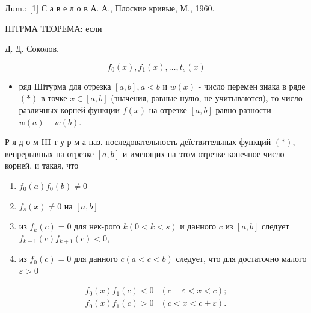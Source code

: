\documentclass[10pt]{article}
\begin{document}
Лum.: [1] С а в е л о в А. А., Плоские кривые, М., 1960.



IIIТРМА ТЕОРЕМА: если



Д. Д. Соколов.



\[

f_{0}(x), f_{1}(x), \ldots, t_{s}(x)

\]



\begin{itemize}

  \item ряд Шітурма для отрезка $[a, b], a<b$ и $w(x)$ - число перемен знака в ряде $(*)$ в точке $x \in[a, b]$ (значения, равные нулю, не учитываются), то число различных корней функции $f(x)$ на отрезке $[a, b]$ равно разности $w(a)-w(b)$.

\end{itemize}



Р я д о м III т у р м а наз. последовательность деїствительных функций $(*)$, вепрерывных на отрезке $[a, b]$ и имеющих на этом отрезке конечное число корней, и такая, что



\begin{enumerate}

  \item $f_{0}(a) f_{0}(b) \neq 0$



  \item $f_{s}(x) \neq 0$ на $[a, b]$



  \item из $f_{k}(c)=0$ для нек-рого $k(0<k<s)$ и данного $c$ из $[a, b]$ следует $f_{k-1}(c) f_{k+1}(c)<0$,



  \item из $f_{0}(c)=0$ для данного $c(a<c<b)$ следует, что для достаточно малого $\varepsilon>0$



\end{enumerate}



\[

\begin{array}{ll}

f_{0}(x) f_{1}(c)<0 & (c-\varepsilon<x<c) ; \\

f_{0}(x) f_{1}(c)>0 & (c<x<c+\varepsilon) .

\end{array}

\]
\end{document}
